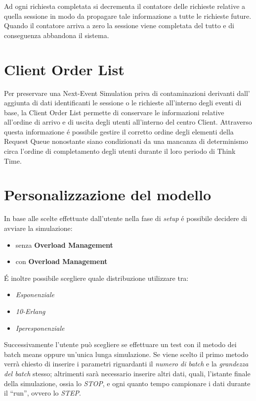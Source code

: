Ad ogni richiesta completata si decrementa il contatore delle richieste relative 
a quella sessione in modo da propagare tale informazione a tutte le richieste 
future. Quando il contatore arriva a zero la sessione viene completata del tutto 
e di conseguenza abbandona il sistema.

\section{Client Order List}
Per preservare una Next-Event Simulation priva di contaminazioni derivanti dall'
aggiunta di dati identificanti le sessione o le richieste all'interno degli eventi di base, 
la Client Order List permette di conservare le 
informazioni relative all'ordine di arrivo e di uscita degli utenti all'interno 
del centro Client. Attraverso questa informazione \'e possibile gestire il 
corretto ordine degli elementi della Request Queue nonostante siano condizionati 
da una mancanza di determinismo circa l'ordine di completamento degli utenti 
durante il loro periodo di Think Time.


\section{Personalizzazione del modello}
In base alle scelte effettuate dall'utente nella fase di \textit{setup} \'e 
possibile decidere di avviare la simulazione:
\begin{itemize}
\item senza \textbf{Overload Management}
\item con \textbf{Overload Management}
\end{itemize}
 
\noindent \'E inoltre possibile scegliere quale distribuzione utilizzare tra:
\begin{itemize}
\item \textit{Esponenziale}
\item \textit{10-Erlang}
\item \textit{Iperesponenziale}
\end{itemize}

\noindent Successivamente l'utente pu\`o scegliere se effettuare un test con
il metodo dei batch means oppure un'unica lunga simulazione. Se viene scelto
il primo metodo verr\`a chiesto di inserire i parametri riguardanti il \textit{numero di batch}
e la \textit{grandezza del batch} stesso; altrimenti sar\`a necessario inserire altri dati, quali,
l'istante finale della simulazione, ossia lo \textit{STOP}, e ogni quanto tempo campionare i dati
durante il ``run'', ovvero lo \textit{STEP}.


